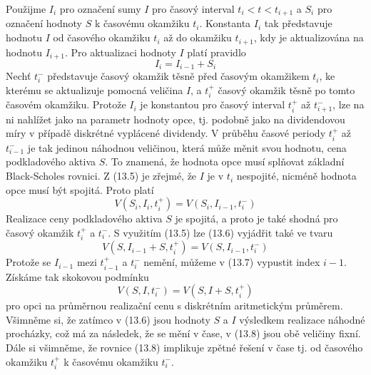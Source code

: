 \documentclass[a4paper]{book}
\begin{document}
Použijme $I_i$ pro označení sumy $I$ pro časový interval $t_i < t < t_{i+1}$ a $S_i$ pro označení hodnoty $S$ k časovému okamžiku $t_i$. Konstanta $I_i$ tak představuje hodnotu $I$ od časového okamžiku $t_i$ až do okamžiku $t_{i+1}$, kdy je aktualizována na hodnotu $I_{i+1}$. Pro aktualizaci hodnoty $I$ platí pravidlo
\begin{equation}
I_i = I_{i-1} + S_i
\end{equation}
Nechť $t_i^{-}$ představuje časový okamžik těsně před časovým okamžikem $t_i$, ke kterému se aktualizuje pomocná veličina $I$, a $t_i^{+}$ časový okamžik těsně po tomto časovém okamžiku. Protože $I_i$ je konstantou pro časový interval $t_i^{+}$ až $t_{i+1}^{-}$, lze na ni nahlížet jako na parametr hodnoty opce, tj. podobně jako na dividendovou míry v případě diskrétné vyplácené dividendy. V průběhu časové periody $t_i^{+}$ až $t_{i-1}^{-}$ je tak jedinou náhodnou veličinou, která může měnit svou hodnotu, cena podkladového aktiva $S$. To znamená, že hodnota opce musí splňovat základní Black-Scholes rovnici. Z (13.5) je zřejmé, že $I$ je v $t_i$ nespojité, nicméně hodnota opce musí být spojitá. Proto platí
\begin{equation}
V(S_i, I_i, t_i^{+}) = V(S_i, I_{i-1},t_i^{-})
\end{equation}
Realizace ceny podkladového aktiva $S$ je spojitá, a proto je také shodná pro časový okamžik $t_i^{+}$ a $t_i^{-}$. S využitím (13.5) lze (13.6) vyjádřit také ve tvaru
\begin{equation}
V(S, I_{i-1} + S, t_i^{+}) = V(S, I_{i-1},t_i^{-})
\end{equation}
Protože se $I_{i-1}$ mezi $t_{i-1}^{+}$ a $t_i^{-}$ nemění, můžeme v (13.7) vypustit index $i-1$. Získáme tak skokovou podmínku
\begin{equation}
V(S, I, t_i^{-}) = V(S, I + S, t_i^{+})
\end{equation}
pro opci na průměrnou realizační cenu s diskrétním aritmetickým průměrem. Všimněme si, že zatímco v (13.6) jsou hodnoty $S$ a $I$ výsledkem realizace náhodné procházky, což má za následek, že se mění v čase, v (13.8) jsou obě veličiny fixní. Dále si všimněme, že rovnice (13.8) implikuje zpětné řešení v čase tj. od časového okamžiku $t_i^+$ k časovému okamžiku $t_i^{-}$.
\end{document}
